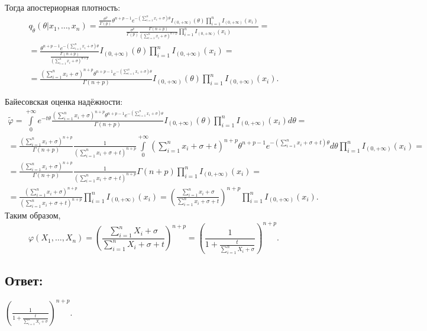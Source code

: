 \documentclass[12pt]{article}
\begin{document}
    Тогда апостериорная плотность:
    \begin{multline*}
        q_{\widetilde{\theta}}(\theta | x_1, \dots, x_n)
        = \frac{\frac{\sigma^p}{\Gamma(p)} \theta^{n+p-1} e^{- \left ( \sum_{i=1}^n x_i + \sigma \right ) \theta } I_{\left ( 0, + \infty\right )}(\theta) \prod_{i=1}^n I_{\left ( 0, + \infty\right )}(x_i)}{\frac{\sigma^p}{\Gamma(p)} \frac{\Gamma(n+p)}{\left ( \sum_{i=1}^n x_i + \sigma \right )^{n+p}} \prod_{i=1}^n I_{\left ( 0, + \infty\right )}(x_i)} = \\
        = \frac{\theta^{n+p-1} e^{- \left ( \sum_{i=1}^n x_i + \sigma \right ) \theta }}{\frac{\Gamma(n+p)}{\left ( \sum_{i=1}^n x_i + \sigma \right )^{n+p}}} I_{\left ( 0, + \infty\right )}(\theta) \prod_{i=1}^n I_{\left ( 0, + \infty\right )}(x_i) = \\
        = \frac{\left ( \sum_{i=1}^n x_i + \sigma \right )^{n+p} \theta^{n+p-1} e^{- \left ( \sum_{i=1}^n x_i + \sigma \right ) \theta }}{\Gamma(n+p)} I_{\left ( 0, + \infty\right )}(\theta) \prod_{i=1}^n I_{\left ( 0, + \infty\right )}(x_i) .
    \end{multline*}

    Байесовская оценка надёжности:
    \begin{multline*}
        \widetilde{\varphi}
        = \int \limits_0^{+\infty} e^{-t \theta} \frac{\left ( \sum_{i=1}^n x_i + \sigma \right )^{n+p} \theta^{n+p-1} e^{- \left ( \sum_{i=1}^n x_i + \sigma \right ) \theta }}{\Gamma(n+p)} I_{\left ( 0, + \infty\right )}(\theta) \prod_{i=1}^n I_{\left ( 0, + \infty\right )}(x_i) d \theta = \\
        = \frac{\left ( \sum_{i=1}^n x_i + \sigma \right )^{n+p}}{\Gamma(n+p)} \frac{1}{\left ( \sum_{i=1}^n x_i + \sigma + t \right )^{n+p}} \int \limits_0^{+\infty} \left ( \sum_{i=1}^n x_i + \sigma + t \right )^{n+p} \theta^{n+p-1} e^{- \left ( \sum_{i=1}^n x_i + \sigma +t \right ) \theta} d \theta \prod_{i=1}^n I_{\left ( 0, + \infty\right )}(x_i) = \\
        = \frac{\left ( \sum_{i=1}^n x_i + \sigma \right )^{n+p}}{\Gamma(n+p)} \frac{1}{\left ( \sum_{i=1}^n x_i + \sigma + t \right )^{n+p}} \Gamma(n+p) \prod_{i=1}^n I_{\left ( 0, + \infty\right )}(x_i) = \\
        = \frac{\left ( \sum_{i=1}^n x_i + \sigma \right )^{n+p}}{\left ( \sum_{i=1}^n x_i + \sigma + t \right )^{n+p}} \prod_{i=1}^n I_{\left ( 0, + \infty\right )}(x_i)
        = \left ( \frac{\sum_{i=1}^n x_i + \sigma}{\sum_{i=1}^n x_i + \sigma + t} \right )^{n+p} \prod_{i=1}^n I_{\left ( 0, + \infty\right )}(x_i) .
    \end{multline*}
    Таким образом,
    \[
        \varphi(X_1, \dots, X_n)
        = \left ( \frac{\sum_{i=1}^n X_i + \sigma}{\sum_{i=1}^n X_i + \sigma + t} \right )^{n+p}
        = \left ( \frac{1}{1 + \frac{t}{\sum_{i=1}^n X_i + \sigma}} \right )^{n+p}.
    \]

    \subsection*{Ответ:}
    $\left ( \frac{1}{1 + \frac{t}{\sum_{i=1}^n X_i + \sigma}} \right )^{n+p}$.
\end{document}
